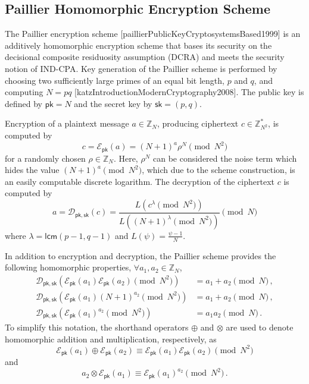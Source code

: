 \subsection{Paillier Homomorphic Encryption Scheme}\label{subsec:prelims:paillier}
The Paillier encryption scheme [paillierPublicKeyCryptosystemsBased1999] is an additively homomorphic encryption scheme that bases its security on the decisional composite residuosity assumption (DCRA) and meets the security notion of IND-CPA. Key generation of the Paillier scheme is performed by choosing two sufficiently large primes of an equal bit length, $p$ and $q$, and computing $N=pq$ [katzIntroductionModernCryptography2008]. The public key is defined by $\mathsf{pk}=N$ and the secret key by $\mathsf{sk}=(p, q)$.

Encryption of a plaintext message $a \in \mathbb{Z}_N$, producing ciphertext $c \in \mathbb{Z}^{*}_{N^2}$, is computed by
\begin{equation}
    c=\mathcal{E}_{\mathsf{pk}}(a) = (N+1)^a \rho^N \pmod{N^2}
\end{equation}
for a randomly chosen $\rho \in \mathbb{Z}_{N}$. Here, $\rho^N$ can be considered the noise term which hides the value $(N+1)^a \pmod{N^2}$, which due to the scheme construction, is an easily computable discrete logarithm. The decryption of the ciphertext $c$ is computed by
\begin{equation}
    a=\mathcal{D}_{\mathsf{pk},\mathsf{sk}}(c) = \frac{L(c^\lambda\pmod{N^2})}{L((N+1)^\lambda\pmod{N^2})} \pmod{N}
\end{equation}
where $\lambda = \mathsf{lcm}(p-1, q-1)$ and $L(\psi) = \frac{\psi-1}{N}$.

In addition to encryption and decryption, the Paillier scheme provides the following homomorphic properties, $\forall a_1,a_2 \in \mathbb{Z}_N$,
\begin{align}
    \mathcal{D}_{\mathsf{pk},\mathsf{sk}}\left(\mathcal{E}_{\mathsf{pk}}(a_1)\mathcal{E}_{\mathsf{pk}}(a_2) \pmod{N^2}\right) &= a_1+a_2 \pmod{N}\,, \label{eq:prelims:paillier_hom_add}\\
    \mathcal{D}_{\mathsf{pk},\mathsf{sk}}\left(\mathcal{E}_{\mathsf{pk}}(a_1)(N+1)^{a_2} \pmod{N^2}\right) &= a_1+a_2 \pmod{N}\,, \label{eq:prelims:paillier_hom_add_plain}\\
    \mathcal{D}_{\mathsf{pk},\mathsf{sk}}\left(\mathcal{E}_{\mathsf{pk}}(a_1)^{a_2} \pmod{N^2}\right) &= a_1a_2 \pmod{N}\,. \label{eq:prelims:paillier_hom_mult}
\end{align}
To simplify this notation, the shorthand operators $\oplus$ and $\otimes$ are used to denote homomorphic addition and multiplication, respectively, as
\begin{equation}\label{eq:prelims:paillier_hom_add_op}
    \mathcal{E}_{\mathsf{pk}}(a_1)\oplus\mathcal{E}_{\mathsf{pk}}(a_2) \equiv \mathcal{E}_{\mathsf{pk}}(a_1)\mathcal{E}_{\mathsf{pk}}(a_2) \pmod{N^2}
\end{equation}
and
\begin{equation}
    a_2\otimes\mathcal{E}_{\mathsf{pk}}(a_1) \equiv \mathcal{E}_{\mathsf{pk}}(a_1)^{a_2} \pmod{N^2}\,.
\end{equation}

